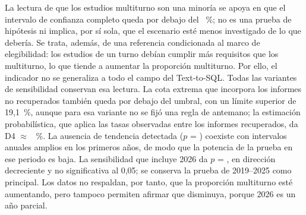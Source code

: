La lectura de que los estudios multiturno son una minoría se apoya en que el intervalo de confianza completo queda por debajo del \umbralMayoria~\%; no es una prueba de hipótesis ni implica, por sí sola, que el escenario esté menos investigado de lo que debería. Se trata, además, de una referencia condicionada al marco de elegibilidad: los estudios de un turno debían cumplir más requisitos que los multiturno, lo que tiende a aumentar la proporción multiturno. Por ello, el indicador no se generaliza a todo el campo del Text-to-SQL. Todas las variantes de sensibilidad conservan esa lectura. La cota extrema que incorpora los informes no recuperados también queda por debajo del umbral, con un límite superior de 19,1~\%, aunque para esa variante no se fijó una regla de antemano; la estimación probabilística, que aplica las tasas observadas entre los informes recuperados, da D4 $\approx$ \DcuatroProbPct~\%. La ausencia de tendencia detectada ($p$ = \DcuatroTendenciaP) coexiste con intervalos anuales amplios en los primeros años, de modo que la potencia de la prueba en ese periodo es baja. La sensibilidad que incluye 2026 da $p$ = \tendenciaConP{}, en dirección decreciente y no significativa al 0,05; se conserva la prueba de 2019--2025 como principal. Los datos no respaldan, por tanto, que la proporción multiturno esté aumentando, pero tampoco permiten afirmar que disminuya, porque 2026 es un año parcial.

